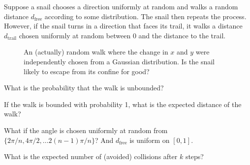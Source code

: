 \documentclass{article}
\begin{document}
Suppose a snail chooses a direction uniformly at random and walks a random
distance $d_\text{free}$ according to some distribution. The snail then
repeats the process. However, if the snail turns in a direction that faces its
trail, it walks a distance $d_\text{trail}$ chosen uniformly at random between
0 and the distance to the trail.
\begin{figure}[ht!]
  \centering
  \caption{
    An (actually) random walk where the change in $x$ and $y$ were
    independently chosen from a Gaussian distribution. Is the snail likely to
    escape from its confine for good?
  }
\end{figure}
\begin{question}
  What is the probability that the walk is unbounded?
\end{question}

\begin{related}
  \item If the walk is bounded with probability 1, what is the expected
    distance of the walk?
  \item What if the angle is chosen uniformly at random from
    $\{2\pi/n, 4\pi/2, \hdots 2(n-1)\pi/n\}$? And $d_\text{free}$ is uniform
    on $[0, 1]$.
  \item What is the expected number of (avoided) collisions after $k$ steps?
\end{related}
\end{document}
